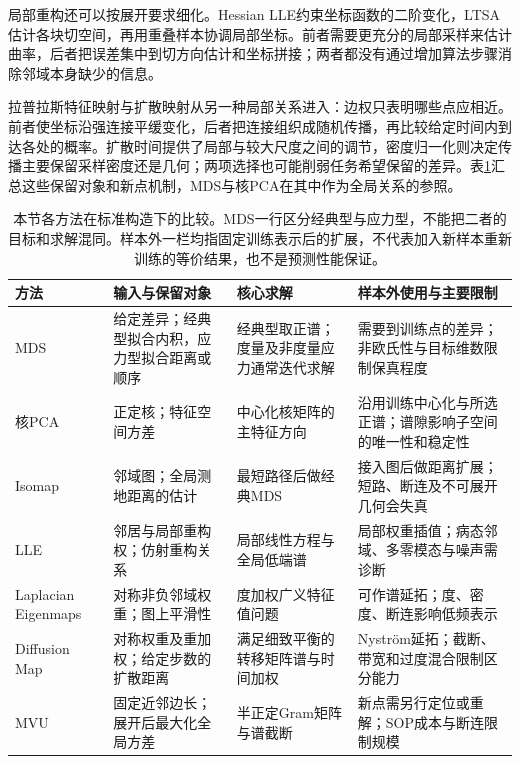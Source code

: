 局部重构还可以按展开要求细化。Hessian LLE约束坐标函数的二阶变化，LTSA估计各块切空间，再用重叠样本协调局部坐标。前者需要更充分的局部采样来估计曲率，后者把误差集中到切方向估计和坐标拼接；两者都没有通过增加算法步骤消除邻域本身缺少的信息。

拉普拉斯特征映射与扩散映射从另一种局部关系进入：边权只表明哪些点应相近。前者使坐标沿强连接平缓变化，后者把连接组织成随机传播，再比较给定时间内到达各处的概率。扩散时间提供了局部与较大尺度之间的调节，密度归一化则决定传播主要保留采样密度还是几何；两项选择也可能削弱任务希望保留的差异。表\ref{tab:dim-manifold-comparison}汇总这些保留对象和新点机制，MDS与核PCA在其中作为全局关系的参照。

\begin{table}[htbp]
  \centering
  \small
  \begin{tabularx}{\linewidth}{@{}>{\RaggedRight\arraybackslash}p{22mm}>{\RaggedRight\arraybackslash}X>{\RaggedRight\arraybackslash}X>{\RaggedRight\arraybackslash}X@{}}
    \toprule
    方法 & 输入与保留对象 & 核心求解 & 样本外使用与主要限制 \\
    \midrule
    MDS & 给定差异；经典型拟合内积，应力型拟合距离或顺序
      & 经典型取正谱；度量及非度量应力通常迭代求解
      & 需要到训练点的差异；非欧氏性与目标维数限制保真程度 \\
    核PCA & 正定核；特征空间方差
      & 中心化核矩阵的主特征方向
      & 沿用训练中心化与所选正谱；谱隙影响子空间的唯一性和稳定性 \\
    Isomap & 邻域图；全局测地距离的估计
      & 最短路径后做经典MDS
      & 接入图后做距离扩展；短路、断连及不可展开几何会失真 \\
    LLE & 邻居与局部重构权；仿射重构关系
      & 局部线性方程与全局低端谱
      & 局部权重插值；病态邻域、多零模态与噪声需诊断 \\
    Laplacian Eigenmaps & 对称非负邻域权重；图上平滑性
      & 度加权广义特征值问题
      & 可作谱延拓；度、密度、断连影响低频表示 \\
    Diffusion Map & 对称权重及重加权；给定步数的扩散距离
      & 满足细致平衡的转移矩阵谱与时间加权
      & Nystr\"om延拓；截断、带宽和过度混合限制区分能力 \\
    MVU & 固定近邻边长；展开后最大化全局方差
      & 半正定Gram矩阵与谱截断
      & 新点需另行定位或重解；SOP成本与断连限制规模 \\
    \bottomrule
  \end{tabularx}
  \caption{本节各方法在标准构造下的比较。MDS一行区分经典型与应力型，不能把二者的目标和求解混同。样本外一栏均指固定训练表示后的扩展，不代表加入新样本重新训练的等价结果，也不是预测性能保证。}
  \label{tab:dim-manifold-comparison}
\end{table}
